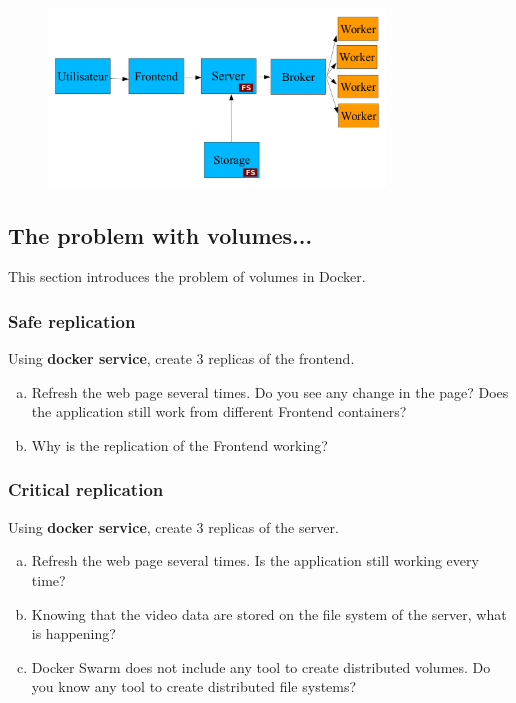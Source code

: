 \documentclass[a4paper,11pt]{exam}
\begin{document}
\begin{figure}[!ht]
	\centering
	\includegraphics[width=0.8\textwidth]{fig/architecture.png}
	\label{fig:architecture}
\end{figure}

\subsection{The problem with volumes...}

This section introduces the problem of volumes in Docker.

\subsubsection{Safe replication}

\begin{questions}
	\question Using \textbf{docker service}, create 3 replicas of the frontend.
	\begin{enumerate}[(a)]
		\item Refresh the web page several times. Do you see any change in the page? Does the application still work from different Frontend containers?
		\item Why is the replication of the Frontend working?
	\end{enumerate}
\end{questions}

\subsubsection{Critical replication}

\begin{questions}
	\question Using \textbf{docker service}, create 3 replicas of the server.
	\begin{enumerate}[(a)]
		\item Refresh the web page several times. Is the application still working every time?
		\item Knowing that the video data are stored on the file system of the server, what is happening?
		\item Docker Swarm does not include any tool to create distributed volumes. Do you know any tool to create distributed file systems?
	\end{enumerate}
\end{questions}
\end{document}
